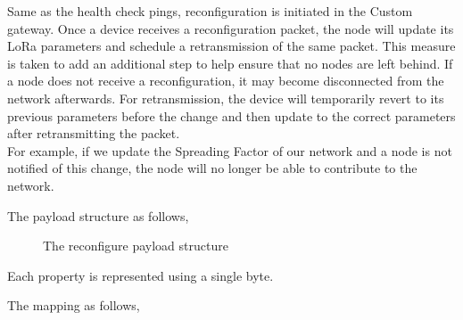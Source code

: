 
Same as the health check pings, reconfiguration is initiated in the Custom gateway. Once a device receives a reconfiguration packet, the node will update its LoRa parameters and schedule a retransmission of the same packet. This measure is taken to add an additional step to help ensure that no nodes are left behind. If a node does not receive a reconfiguration, it may become disconnected from the network afterwards. For retransmission, the device will temporarily revert to its previous parameters before the change and then update to the correct parameters after retransmitting the packet. \\

For example, if we update the Spreading Factor of our network and a node is not notified of this change, the node will no longer be able to contribute to the network.

The payload structure as follows,

\begin{figure}[ht!]
    \centering
    
    \caption{The reconfigure payload structure}
    \label{fig:healthck}
\end{figure}

Each property is represented using a single byte.

The mapping as follows,

\begin{table}[ht!]
\caption{Spreading Factor Mapping}
\label{tab:my-table}
\end{table}

